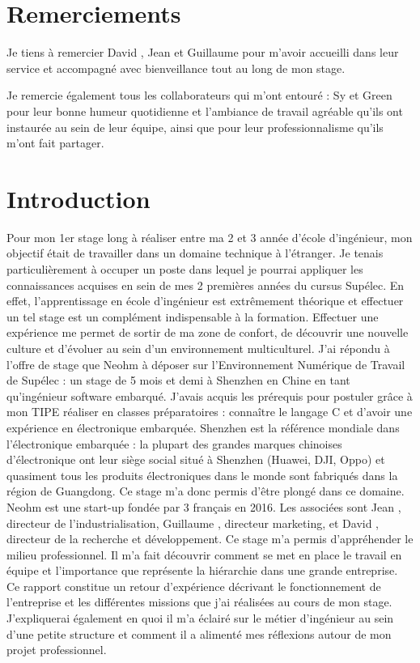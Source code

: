 \documentclass[a4paper, 12pt, sffamily]{report}
\begin{document}
\renewcommand{\contentsname}{Sommaire} %

\tableofcontents

\chapter*{Remerciements}

Je tiens à remercier David , Jean  et Guillaume  pour m’avoir accueilli dans leur service et accompagné avec bienveillance tout au long de mon stage.

Je remercie également tous les collaborateurs qui m’ont entouré : Sy et Green pour leur bonne humeur quotidienne et l’ambiance de travail agréable qu’ils ont instaurée au sein de leur équipe, ainsi que pour leur professionnalisme qu’ils m’ont fait partager.

\chapter{Introduction}
Pour mon 1er stage long à réaliser entre ma 2\ieme{} et 3\ieme{} année d’école d’ingénieur, mon objectif était de travailler dans un domaine technique à l’étranger. Je tenais particulièrement à occuper un poste dans lequel je pourrai appliquer les connaissances acquises en sein de mes 2 premières années du cursus Supélec. En effet, l’apprentissage en école d’ingénieur est extrêmement théorique et effectuer un tel stage est un complément indispensable à la formation. Effectuer une expérience me permet de sortir de ma zone de confort, de découvrir une nouvelle culture et d’évoluer au sein d’un environnement multiculturel. 
J’ai répondu à l’offre de stage que Neohm à déposer sur l’Environnement Numérique de Travail de Supélec : un stage de 5 mois et demi à Shenzhen en Chine en tant qu’ingénieur software embarqué. J’avais acquis les prérequis pour postuler grâce à mon TIPE réaliser en classes préparatoires : connaître le langage C et d’avoir une expérience en électronique embarquée.
Shenzhen est la référence mondiale dans l’électronique embarquée : la plupart des grandes marques chinoises d’électronique ont leur siège social situé à Shenzhen (Huawei, DJI, Oppo) et quasiment tous les produits électroniques dans le monde sont fabriqués dans la région de Guangdong. Ce stage m’a donc permis d’être plongé dans ce domaine.
Neohm est une start-up fondée par 3 français en 2016. Les associées sont Jean , directeur de l’industrialisation, Guillaume , directeur marketing, et David , directeur de la recherche et développement. 
Ce stage m’a permis d’appréhender le milieu professionnel. Il m’a fait découvrir comment se met en place le travail en équipe et l’importance que représente la hiérarchie dans une grande entreprise.
Ce rapport constitue un retour d’expérience décrivant le fonctionnement de l’entreprise et les différentes missions que j’ai réalisées au cours de mon stage. J’expliquerai également en quoi il m’a éclairé sur le métier d’ingénieur au sein d’une petite structure et comment il a alimenté mes réflexions autour de mon projet professionnel.
\end{document}
